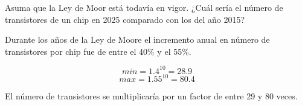 \begin{acexercise}\end{acexercise}

Asuma que la Ley de Moor está todavía en vigor.
¿Cuál sería el número de transistores de un chip en 2025 comparado con los del año 2015?


\begin{acsolution}\end{acsolution}

Durante los años de la Ley de Moore el incremento anual en número de transistores por chip
fue de entre el 40\% y el 55\%.

\[min = 1.4^{10} = 28.9\]
\[max = 1.55^{10} = 80.4\]

El número de transistores se multiplicaría por un factor de entre 29 y 80 veces.
